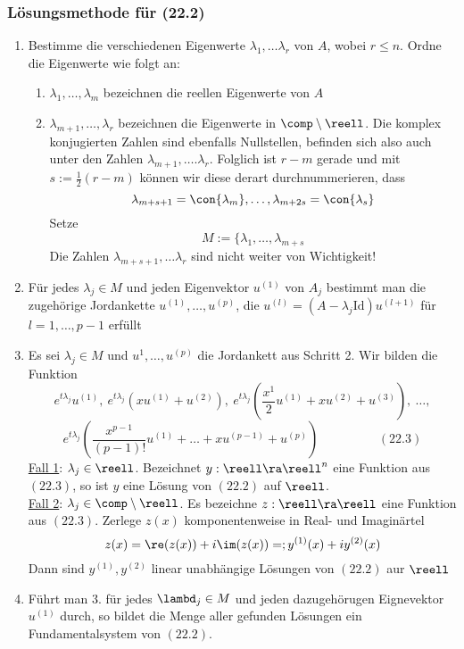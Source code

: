 \documentclass{kit}
\begin{document}
    \subsubsection{Lösungsmethode für (22.2)}
      \begin{enumerate}[label=\arabic*.]
        \item Bestimme die verschiedenen Eigenwerte $\lambda_1,\dots\lambda_r$ von $A$, wobei $r\le n$. Ordne die Eigenwerte
          wie folgt an:
          \begin{enumerate}[label=\roman*)]
            \item $\lambda_1,\dots,\lambda_m$ bezeichnen die reellen Eigenwerte von $A$
            \item $\lambda_{m+1},\dots,\lambda_r$ bezeichnen die Eigenwerte in $\comp\setminus\reell$. Die komplex
              konjugierten Zahlen sind ebenfalls Nullstellen, befinden sich also auch unter den Zahlen $\lambda_{m+1},\dots.
              \lambda_r$. Folglich ist $r-m$ gerade und mit $s:=\frac{1}{2}(r-m)$ können wir diese derart durchnummerieren,
              dass
              $$\lambda_{m+s+1}=\con{\lambda_m},\dots,\lambda_{m+2s}=\con{\lambda_s}$$
              Setze
              $$M:=\{\lambda_1,\dots,\lambda_{m+s}$$
              Die Zahlen $\lambda_{m+s+1},\dots\lambda_r$ sind nicht weiter von Wichtigkeit!
          \end{enumerate}
        \item Für jedes $\lambda_j\in M$ und jeden Eigenvektor $u^{(1)}$ von $A_j$ bestimmt man die zugehörige Jordankette
          $u^{(1)},\dots,u^{(p)}$, die $u^{(l)}=(A-\lambda_j\text{Id})u^{(l+1)}$ für $l=1,\dots,p-1$ erfüllt
        \item Es sei $\lambda_j\in M$ und $u^1,\dots,u^{(p)}$ die Jordankett aus Schritt 2. Wir bilden die Funktion
          $$e^{t\lambda_j}u^{(1)},\ e^{t\lambda_j}(xu^{(1)}+u^{(2)}),\ 
          e^{t\lambda_j}\left(\frac{x^1}{2}u^{(1)}+xu^{(2)}+u^{(3)}\right),\ \dots,$$
          $$e^{t\lambda_j}\left(\frac{x^{p-1}}{(p-1)!}u^{(1)}+\dots+xu^{(p-1)}+u^{(p)}\right)\hspace{2cm}(22.3)$$
          \underline{Fall 1}: $\lambda_j\in\reell$. Bezeichnet $y:\reell\ra\reell^n$ eine Funktion aus $(22.3)$, so ist $y$
          eine Lösung von $(22.2)$ auf $\reell$.\\
          \underline{Fall 2}: $\lambda_j\in\comp\setminus\reell$. Es bezeichne $z:\reell\ra\reell$ eine Funktion aus 
          $(22.3)$. Zerlege $z(x)$ komponentenweise in Real- und Imaginärtel
          $$z(x)=\re(z(x))+i\im(z(x))=;y^{(1)}(x)+iy^{(2)}(x)$$
          Dann sind $y^{(1)},y^{(2)}$ linear unabhängige Lösungen von $(22.2)$ aur $\reell$
        \item Führt man 3. für jedes $\lambd_j\in M$ und jeden dazugehörugen Eignevektor $u^{(1)}$ durch, so bildet die
          Menge aller gefunden Lösungen ein Fundamentalsystem von $(22.2)$.
      \end{enumerate}
\end{document}
